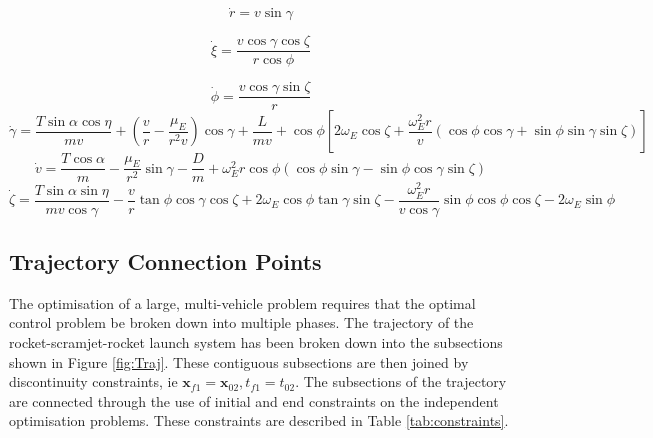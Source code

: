 \begin{equation}
\dot{r} = v \sin \gamma
\end{equation}

\begin{equation}
\dot{\xi} = \frac{v\cos \gamma \cos \zeta}{r \cos \phi}
\end{equation}

\begin{equation}
\dot{\phi} = \frac{v\cos\gamma\sin\zeta}{r}
\end{equation}
\begin{equation}
\dot{\gamma} = \frac{T\sin\alpha \cos\eta}{mv} + (\frac{v}{r}-\frac{\mu_E}{r^2 v})\cos\gamma + \frac{L}{mv}
+ \cos\phi[2\omega_E \cos\zeta + \frac{\omega_E^2 r}{v}(\cos\phi\cos\gamma+\sin\phi\sin\gamma\sin\zeta)]
\end{equation}
\begin{equation}
\dot{v} = \frac{T\cos\alpha}{m}-\frac{\mu_E}{r^2}\sin\gamma - \frac{D}{m}
+ \omega_E^2 r\cos\phi(\cos\phi\sin\gamma-\sin\phi\cos\gamma\sin\zeta)
\end{equation}
\begin{equation}
\dot{\zeta} = \frac{T\sin\alpha \sin\eta}{mv \cos \gamma}-\frac{v}{r}\tan\phi\cos\gamma\cos\zeta +2\omega_E\cos\phi\tan\gamma\sin\zeta - \frac{\omega_E^2 r}{v\cos\gamma}\sin\phi\cos\phi\cos\zeta-2\omega_E\sin\phi 
\end{equation}

\subsection{Trajectory Connection Points}

The optimisation of a large, multi-vehicle problem requires that the optimal control problem be broken down into multiple phases.
 The trajectory of the rocket-scramjet-rocket launch system has been broken down into the subsections shown in Figure \ref{fig:Traj}. These contiguous subsections are then joined by discontinuity constraints, ie $\textbf{x}_{f1} = \textbf{x}_{02}, t_{f1} = t_{02}$. The subsections of the trajectory are connected through the use of initial and end constraints on the independent optimisation problems. These constraints are described in Table \ref{tab:constraints}.

